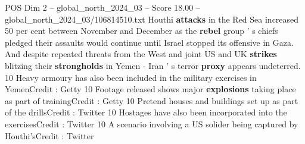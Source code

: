 \begin{textsample}{POS Dim 2 – global\_north\_2024\_03 – Score 18.00 – global\_north\_2024\_03/106814510.txt}
Houthi \textbf{attacks} in the Red Sea increased 50 per cent between November and December as the \textbf{rebel} group ' s chiefs pledged their assaults would continue until Israel stopped its offensive in Gaza.
And despite repeated threats from the West and joint US and UK \textbf{strikes} blitzing their \textbf{strongholds} in Yemen - Iran ' s terror \textbf{proxy} appears undeterred. 10 Heavy armoury has also been included in the military exercises in YemenCredit : Getty 10 Footage released shows major \textbf{explosions} taking place as part of trainingCredit : Getty 10 Pretend houses and buildings set up as part of the drillsCredit : Twitter 10 Hostages have also been incorporated into the exercisesCredit : Twitter 10 A scenario involving a US solider being captured by Houthi'sCredit : Twitter

\end{textsample}
